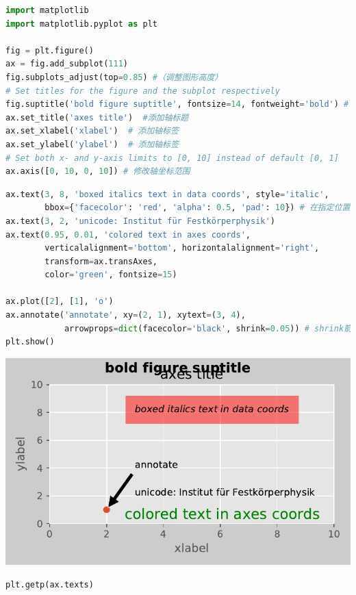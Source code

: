 \documentclass[UTF8,a4paper,12pt]{ctexart}  %
\begin{document}
\begin{lstlisting}[language=Python]
import matplotlib
import matplotlib.pyplot as plt

fig = plt.figure()
ax = fig.add_subplot(111)
fig.subplots_adjust(top=0.85) #（调整图形高度）
# Set titles for the figure and the subplot respectively
fig.suptitle('bold figure suptitle', fontsize=14, fontweight='bold') # 添加图标题
ax.set_title('axes title')  #添加轴标题
ax.set_xlabel('xlabel')  # 添加轴标签
ax.set_ylabel('ylabel')  # 添加轴标签
# Set both x- and y-axis limits to [0, 10] instead of default [0, 1]
ax.axis([0, 10, 0, 10]) # 修改轴坐标范围
\end{lstlisting}

\begin{lstlisting}[language=Python]
ax.text(3, 8, 'boxed italics text in data coords', style='italic',
        bbox={'facecolor': 'red', 'alpha': 0.5, 'pad': 10}) # 在指定位置添加文本，alpha对应透明度，pad对应图形宽度
ax.text(3, 2, 'unicode: Institut für Festkörperphysik')
ax.text(0.95, 0.01, 'colored text in axes coords',
        verticalalignment='bottom', horizontalalignment='right',
        transform=ax.transAxes,
        color='green', fontsize=15)

ax.plot([2], [1], 'o')
ax.annotate('annotate', xy=(2, 1), xytext=(3, 4),
            arrowprops=dict(facecolor='black', shrink=0.05)) # shrink箭头长短
plt.show()
\end{lstlisting}

\begin{center}\includegraphics[width=0.9\linewidth]{python-visualization_files/figure-latex/unnamed-chunk-51-1} \end{center}

\begin{lstlisting}[language=Python]
plt.getp(ax.texts)
\end{lstlisting}
\end{document}
